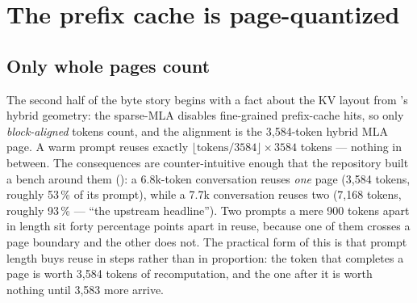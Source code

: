\section{The prefix cache is page-quantized}
\label{sec:proof-prefixpage}

\subsection{Only whole pages count}

The second half of the byte story begins with a fact about the KV layout from
's hybrid geometry: the sparse-MLA  disables
fine-grained prefix-cache hits, so only \emph{block-aligned} tokens count, and
the alignment is the 3{,}584-token hybrid MLA page. A warm prompt reuses
exactly $\lfloor \text{tokens} / 3584 \rfloor \times 3584$ tokens --- nothing
in between. The consequences are counter-intuitive enough that the repository built
a bench around them (): a 6.8k-token conversation
reuses \emph{one} page (3{,}584 tokens, roughly 53\,\% of its prompt), while a
7.7k conversation reuses two (7{,}168 tokens, roughly 93\,\% --- ``the
upstream headline''). Two prompts a mere 900 tokens apart in length sit forty
percentage points apart in reuse, because one of them crosses a page boundary
and the other does not. The practical form of this is that prompt length buys
reuse in steps rather than in proportion: the token that completes a page is
worth 3{,}584 tokens of recomputation, and the one after it is worth nothing
until 3{,}583 more arrive.

